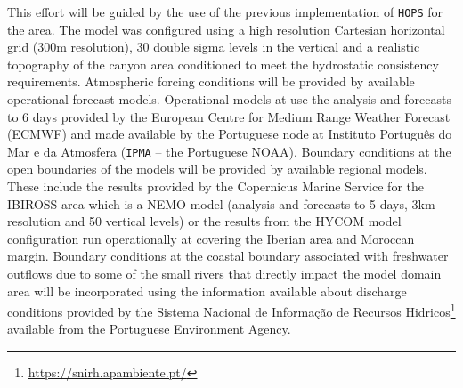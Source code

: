 This effort will be guided by the use of the previous implementation
of \texttt{HOPS} for the \naz area. The model was configured using a
high resolution Cartesian horizontal grid (300m resolution), 30 double
sigma levels in the vertical and a realistic topography of the \naz
canyon area conditioned to meet the hydrostatic consistency
requirements.  Atmospheric forcing conditions will be provided by
available operational forecast models. Operational models at \inst use
the analysis and forecasts to 6 days provided by the European Centre
for Medium Range Weather Forecast (ECMWF) and made available by the
Portuguese node at Instituto Portugu\^{e}s do Mar e da Atmosfera
(\texttt{IPMA} -- the Portuguese NOAA).  Boundary conditions at the
open boundaries of the models will be provided by available regional
models. These include the results provided by the Copernicus Marine
Service for the IBIROSS area which is a NEMO model (analysis and
forecasts to 5 days, 3km resolution and 50 vertical levels) or the
results from the HYCOM model configuration run operationally at \inst
covering the Iberian area and Moroccan margin.  Boundary conditions at
the coastal boundary associated with freshwater outflows due to some
of the small rivers that directly impact the model domain area will be
incorporated using the information available about discharge
conditions provided by the Sistema Nacional de Informa\c{c}\~{a}o de
Recursos Hidricos\footnote{\url{https://snirh.apambiente.pt/}}
available from the Portuguese Environment Agency.


